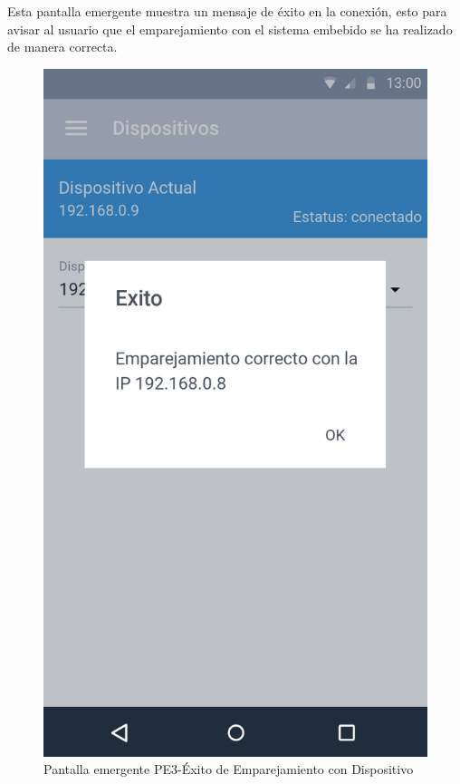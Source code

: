 Esta pantalla emergente muestra un mensaje de éxito en la conexión, esto para avisar al usuario que el emparejamiento con el sistema embebido se ha realizado de manera correcta.

\begin{figure}[H]
	\centering
	\includegraphics[scale=0.70]{Capitulo4/software/submodulos/images/exito_disp.png}
	\caption{Pantalla emergente PE3-Éxito de Emparejamiento con Dispositivo}
	\label{fig:Exito Emparejamiento}
\end{figure}

